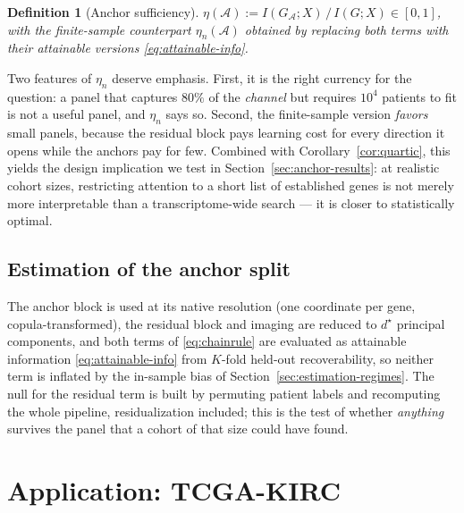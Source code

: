 \documentclass{article}
\newtheorem{definition}{Definition}
\begin{document}
\begin{definition}[Anchor sufficiency]
\label{def:anchor-suff}
$\eta(\mathcal{A}) := I(G_\mathcal{A};X)\,/\,I(G;X)\in[0,1]$, with the
finite-sample counterpart $\eta_n(\mathcal{A})$ obtained by replacing both
terms with their attainable versions \eqref{eq:attainable-info}.
\end{definition}

Two features of $\eta_n$ deserve emphasis. First, it is the right currency for
the question: a panel that captures $80\%$ of the \emph{channel} but requires
$10^4$ patients to fit is not a useful panel, and $\eta_n$ says so. Second, the
finite-sample version \emph{favors} small panels, because the residual block
pays learning cost for every direction it opens while the anchors pay for few.
Combined with Corollary~\ref{cor:quartic}, this yields the design implication we
test in Section~\ref{sec:anchor-results}: at realistic cohort sizes, restricting
attention to a short list of established genes is not merely more interpretable
than a transcriptome-wide search --- it is closer to statistically optimal.

\subsection{Estimation of the anchor split}
\label{sec:anchor-estimation}

The anchor block is used at its native resolution (one coordinate per gene,
copula-transformed), the residual block and imaging are reduced to $d^\star$
principal components, and both terms of \eqref{eq:chainrule} are evaluated as
attainable information \eqref{eq:attainable-info} from $K$-fold held-out
recoverability, so neither term is inflated by the in-sample bias of
Section~\ref{sec:estimation-regimes}. The null for the residual term is built by
permuting patient labels and recomputing the whole pipeline, residualization
included; this is the test of whether \emph{anything} survives the panel that a
cohort of that size could have found.

\section{Application: TCGA-KIRC}
\label{sec:kirc}
\label{sec:tcga-kirc}
\end{document}
